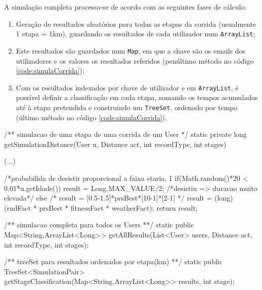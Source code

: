 \documentclass[a4paper,10pt]{report}
\begin{document}
A simulação completa processa-se de acordo com as seguintes fases de cálculo:
\begin{enumerate}
 \item Geração de resultados aleatórios para todas as etapas da corrida (usualmente 1 etapa = 1km), 
	  guardando os resultados de cada utilizador num \verb!ArrayList!;
 \item Este resultados são guardados num \verb!Map!, em que a chave são os emails dos utilizadores e os valores os resultados referidos 
	  (penúltimo método no código \ref{code:simulaCorrida});
 \item Com os resultados indexados por chave de utilizador e em \verb!ArrayList!, é possível definir a classificação em cada etapa,
	  somando os tempos acumulados até à etapa pretendida e construindo um \verb!TreeSet!, ordenado por tempo
	  (último método no código \ref{code:simulaCorrida}).
\end{enumerate}

\begin{code}[caption=Métodos para a simulação de corridas (src/core/EventSimulation.java)., label=code:simulaCorrida]
/** simulacao de uma etapa de uma corrida de um User */
static private long getSimulationDistance(User u, Distance act,
                                                int recordType, int stages) {
    (...)

    /*probabilida de desistir proporcional a faixa etaria, 1%
    if(Math.random()*20 < 0.01*u.getIdade())
	result = Long.MAX_VALUE/2; /*desistiu => duracao muito elevada*/
    else{
	/* result = [0.5-1.5]*prsBest*[10-1]*[2-1] */
	result = (long) (rndFact * prsBest * fitnessFact * weatherFact);
    }
    return result;
}

/** simulacao completa para todos os Users **/
static public Map<String,ArrayList<Long>> getAllResults(List<User> users, Distance act, 
                                                int recordType, int stages);

/** treeSet para resultados ordenados por etapa(km) **/
static public TreeSet<SimulationPair> getStageClassification(Map<String,ArrayList<Long>> results, int stage);
\end{code}
\end{document}
